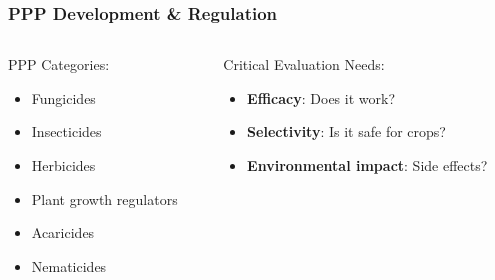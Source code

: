 \documentclass[aspectratio=43]{beamer}
\begin{document}

\begin{frame}
    \frametitle{PPP Development \& Regulation}
    
    \begin{columns}
        \begin{column}{0.5\textwidth}
            \begin{block}{PPP Categories:}
                \begin{itemize}
                    \item Fungicides
                    \item Insecticides
                    \item Herbicides
                    \item Plant growth regulators
                    \item Acaricides
                    \item Nematicides
                \end{itemize}
            \end{block}
        \end{column}
        
        \begin{column}{0.5\textwidth}
            \begin{block}{Critical Evaluation Needs:}
                \begin{itemize}
                    \item \textbf{Efficacy}: Does it work?
                    \item \textbf{Selectivity}: Is it safe for crops?
                    \item \textbf{Environmental impact}: Side effects?
                \end{itemize}
            \end{block}
        \end{column}
    \end{columns}
\end{frame}
\end{document}
